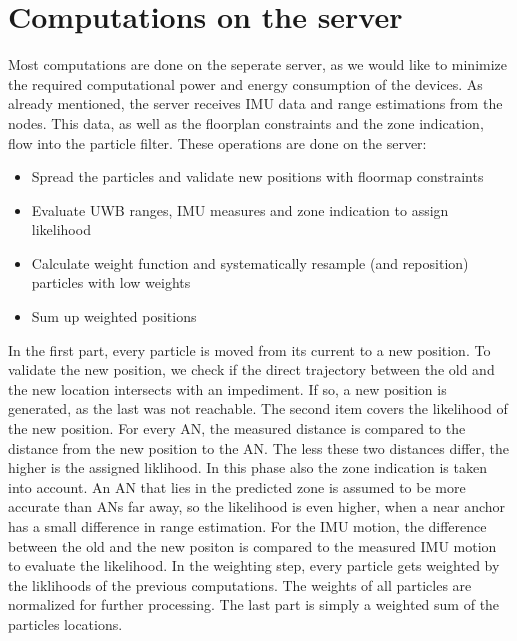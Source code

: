\section{Computations on the server}
Most computations are done on the seperate server, as we would like to minimize the required computational power and energy consumption of the devices. As already mentioned, the server receives IMU data and range estimations from the nodes. This data, as well as the floorplan constraints and the zone indication, flow into the particle filter. These operations are done on the server:
\begin{itemize}
\item Spread the particles and validate new positions with floormap constraints
\item Evaluate UWB ranges, IMU measures and zone indication to assign likelihood
\item Calculate weight function and systematically resample (and reposition) particles with low weights
\item Sum up weighted positions
\end{itemize}

In the first part, every particle is moved from its current to a new position. To validate the new position, we check if the direct trajectory between the old and the new location intersects with an impediment. If so, a new position is generated, as the last was not reachable.
The second item covers the likelihood of the new position. For every AN, the measured distance is compared to the distance from the new position to the AN. The less these two distances differ, the higher is the assigned liklihood. In this phase also the zone indication is taken into account. An AN that lies in the predicted zone is assumed to be more accurate than ANs far away, so the likelihood is even higher, when a near anchor has a small difference in range estimation. For the IMU motion, the difference between the old and the new positon is compared to the measured IMU motion to evaluate the likelihood.
In the weighting step, every particle gets weighted by the liklihoods of the previous computations. The weights of all particles are normalized for further processing.
The last part is simply a weighted sum of the particles locations.